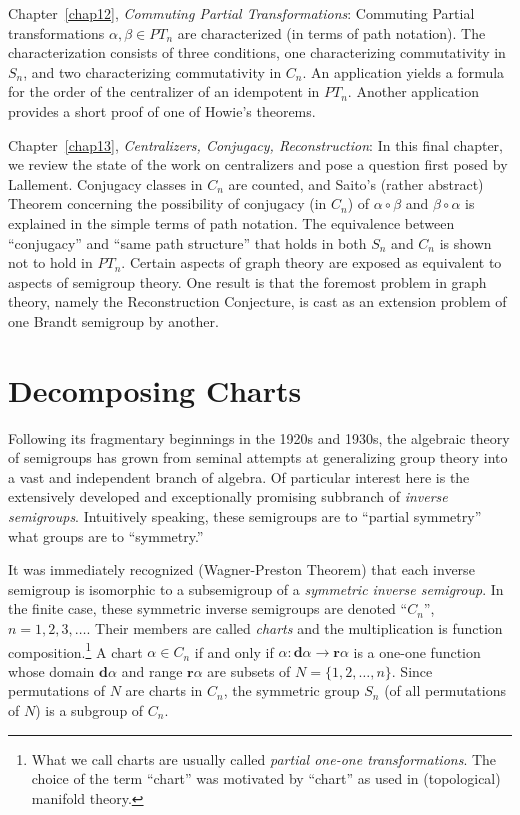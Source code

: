 \documentclass{surv-l}
\numberwithin{equation}{section}
\numberwithin{table}{section}
\numberwithin{figure}{section}
\theoremstyle{definition}
\begin{document}
Chapter~\ref{chap12}, \emph{Commuting Partial Transformations}:
Commuting Partial transformations $\alpha,\beta\in PT_{n}$ are
characterized (in terms of path notation). The characterization
consists of three conditions, one characterizing commutativity in
$S_{n}$, and two characterizing commutativity in $C_{n}$. An
application yields a formula for the order of the centralizer of
an idempotent in $PT_{n}$. Another application provides a short
proof of one of Howie's theorems.

Chapter~\ref{chap13}, \emph{Centralizers, Conjugacy,
Reconstruction}: In this final chapter, we review the state of the
work on centralizers and pose a question first posed by Lallement.
Conjugacy classes in $C_{n}$ are counted, and Saito's (rather
abstract) Theorem concerning the possibility of conjugacy (in
$C_{n}$) of $\alpha \circ \beta$ and $\beta \circ\alpha$ is
explained in the simple terms of path notation. The equivalence
between ``conjugacy'' and ``same path structure'' that holds in
both $S_{n}$ and $C_{n}$ is shown not to hold in $PT_{n}$. Certain
aspects of graph theory are exposed as equivalent to aspects of
semigroup theory. One result is that the foremost problem in graph
theory, namely the Reconstruction Conjecture, is cast as an
extension problem of one Brandt semigroup by another.

\chapter{Decomposing Charts}\label{chap1}

Following its fragmentary beginnings in the 1920s and 1930s, the
algebraic theory of semigroups has grown from seminal attempts at
generalizing group theory into a vast and independent branch of
algebra. Of particular interest here is the extensively developed
and exceptionally promising subbranch of \emph{inverse
semigroups}. Intuitively speaking, these
semigroups are to ``partial symmetry'' what groups are to ``symmetry.''

It was immediately recognized (Wagner-Preston Theorem) that each
inverse semigroup is isomorphic to a subsemigroup of a
\emph{symmetric inverse semigroup}. In the finite case, these
symmetric inverse semigroups are denoted ``$C_{n}$'',
$n=1,2,3,\ldots.$ Their members are called
\emph{charts} and the multiplication is function
composition.\footnote{What we call charts are usually called
\emph{partial one-one transformations}. The choice of the term
``chart'' was motivated by ``chart'' as used in (topological)
manifold theory.} A chart $\alpha\in C_{n}$ if and only if $\alpha
: \mathbf{d}\alpha\rightarrow \mathbf{r}\alpha$ is a one-one
function whose domain $\mathbf{d}\alpha$ and range
$\mathbf{r}\alpha$ are subsets of $N=\{1,2,\ldots, n\}$. Since
permutations of $N$ are charts in $C_{n}$, the symmetric group
$S_{n}$ (of all permutations of $N$) is a subgroup of $C_{n}$.
\end{document}
